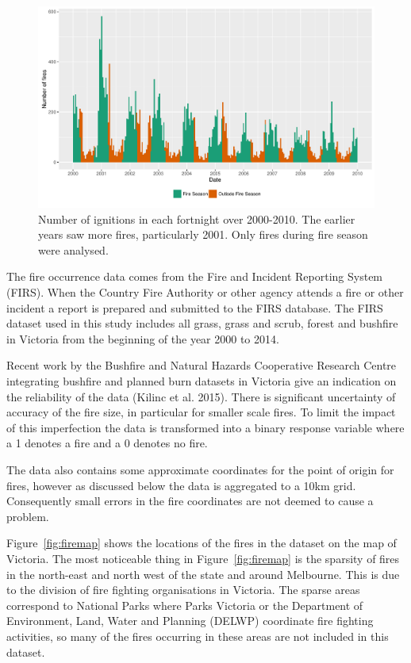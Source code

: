 \documentclass[11pt,a4paper]{article}
\begin{document}
\begin{figure}
  \centering
  \includegraphics[width=.8\textwidth]{figures/occurence.pdf}
  \caption{Number of ignitions in each fortnight over 2000-2010. The earlier years saw more fires, particularly 2001. Only fires during fire season were analysed.}
  \label{fig:occ}
\end{figure}

The fire occurrence data comes from the Fire and Incident Reporting System (FIRS). When the Country Fire Authority or other agency attends a fire or other incident a report is prepared and submitted to the FIRS database. The FIRS dataset used in this study includes all grass, grass and scrub, forest and bushfire in Victoria from the beginning of the year 2000 to 2014.

Recent work by the Bushfire and Natural Hazards Cooperative Research Centre integrating bushfire and planned burn datasets in Victoria give an indication on the reliability of the data (Kilinc et al. 2015).  There is significant uncertainty of accuracy of the fire size, in particular for smaller scale fires. To limit the impact of this imperfection the data is transformed into a binary response variable where a 1 denotes a fire and a 0 denotes no fire.

The data also contains some approximate coordinates for the point of origin for fires, however as discussed below the data is aggregated to a 10km grid. Consequently small errors in the fire coordinates are not deemed to cause a problem.

Figure~\ref{fig:firemap} shows the locations of the fires in the dataset on the map of Victoria. The most noticeable thing in Figure~\ref{fig:firemap} is the sparsity of fires in the north-east and north west of the state and around Melbourne. This is due to the division of fire fighting organisations in Victoria. The sparse areas correspond to National Parks where Parks Victoria or the Department of Environment, Land, Water and Planning (DELWP) coordinate fire fighting activities, so many of the fires occurring in these areas are not included in this dataset.
\end{document}
